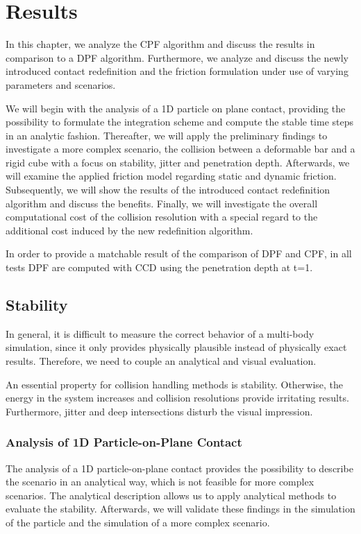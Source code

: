\chapter{Results}
\label{ch:results}
In this chapter, we analyze the CPF algorithm and discuss the results in comparison to a DPF algorithm. Furthermore, we analyze and discuss the newly introduced contact redefinition and the friction formulation under use of varying parameters and scenarios.



We will begin with the analysis of a 1D particle on plane contact, providing the possibility to formulate the integration scheme and compute the stable time steps in an analytic fashion.
Thereafter, we will apply the preliminary findings to investigate a more complex scenario, the collision between a deformable bar and a rigid cube with a focus on stability, jitter and penetration depth. 
Afterwards, we will examine the applied friction model regarding static and dynamic friction.
Subsequently, we will show the results of the introduced contact redefinition algorithm and discuss the benefits.
Finally, we will investigate the overall computational cost of the collision resolution with a special regard to the additional cost induced by the new redefinition algorithm.

In order to provide a matchable result of the comparison of DPF and CPF, in all tests DPF are computed with CCD using the penetration depth at t=1.
\section{Stability}
\label{sec::stability}
In general, it is difficult to measure the correct behavior of a multi-body simulation, since it only provides physically plausible instead of physically exact results. Therefore, we need to couple an analytical and visual evaluation.

An essential property for collision handling methods is stability. Otherwise, the energy in the system increases and collision resolutions provide irritating results. Furthermore, jitter and deep intersections disturb the visual impression.

\subsection{Analysis of 1D Particle-on-Plane Contact}
The analysis of a 1D particle-on-plane contact provides the possibility to describe the scenario in an analytical way, which is not feasible for more complex scenarios.
The analytical description allows us to apply analytical methods to evaluate the stability. Afterwards, we will validate these findings in the simulation of the particle and the simulation of a more complex scenario.

